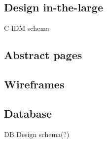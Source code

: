 \subsection{Design in-the-large}
C-IDM schema

\subsection{Abstract pages}

\subsection{Wireframes}

\subsection{Database}
DB Design schema(?)

